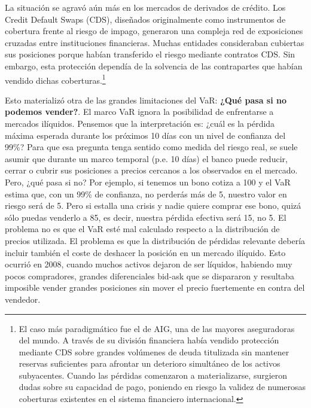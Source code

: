 \documentclass[10pt,a4paper]{article}
\begin{document}
La situación se agravó aún más en los mercados de derivados de crédito. Los Credit Default Swaps (CDS), diseñados originalmente como instrumentos de cobertura frente al riesgo de impago, generaron una compleja red de exposiciones cruzadas entre instituciones financieras. Muchas entidades consideraban cubiertas sus posiciones porque habían transferido el riesgo mediante contratos CDS. Sin embargo, esta protección dependía de la solvencia de las contrapartes que habían vendido dichas coberturas.\footnote{%
    El caso más paradigmático fue el de AIG, una de las mayores aseguradoras del mundo. A través de su división financiera había vendido protección mediante CDS sobre grandes volúmenes de deuda titulizada sin mantener reservas suficientes para afrontar un deterioro simultáneo de los activos subyacentes. Cuando las pérdidas comenzaron a materializarse, surgieron dudas sobre su capacidad de pago, poniendo en riesgo la validez de numerosas coberturas existentes en el sistema financiero internacional.
}

Esto materializó otra de las grandes limitaciones del VaR: \textbf{¿Qué pasa si no podemos vender?}. El marco VaR ignora la posibilidad de enfrentarse a mercados ilíquidos. Pensemos que la interpretación es: ¿cuál es la pérdida máxima esperada durante los próximos 10 días con un nivel de confianza del 99\%? Para que esa pregunta tenga sentido como medida del riesgo real, se suele asumir que durante un marco temporal (p.e. 10 días) el banco puede reducir, cerrar o cubrir sus posiciones a precios cercanos a los observados en el mercado. Pero, ¿qué pasa si no? Por ejemplo, si tenemos un bono cotiza a 100 y el VaR estima que, con un 99\% de confianza, no perderás más de 5, nuestro valor en riesgo será de 5. Pero si estalla una crisis y nadie quiere comprar ese bono, quizá sólo puedas venderlo a 85, es decir, nuestra pérdida efectiva será 15, no 5. El problema no es que el VaR esté mal calculado respecto a la distribución de precios utilizada. El problema es que la distribución de pérdidas relevante debería incluir también el coste de deshacer la posición en un mercado ilíquido. Esto ocurrió en 2008, cuando muchos activos dejaron de ser líquidos, habiendo muy pocos compradores, grandes diferenciales bid-ask que se dispararon y resultaba imposible vender grandes posiciones sin mover el precio fuertemente en contra del vendedor.
\end{document}
